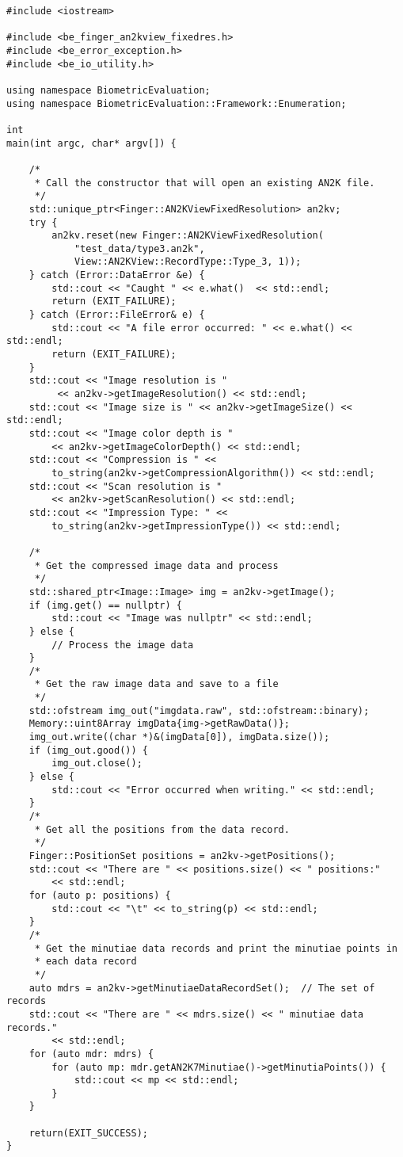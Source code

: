 \begin{lstlisting}[caption={Using an AN2K Finger View}, label=lst:an2kfingerviewuse]
#include <iostream>

#include <be_finger_an2kview_fixedres.h>
#include <be_error_exception.h>
#include <be_io_utility.h>

using namespace BiometricEvaluation;
using namespace BiometricEvaluation::Framework::Enumeration;

int
main(int argc, char* argv[]) {

	/*
	 * Call the constructor that will open an existing AN2K file.
	 */
	std::unique_ptr<Finger::AN2KViewFixedResolution> an2kv;
	try {
		an2kv.reset(new Finger::AN2KViewFixedResolution(
		    "test_data/type3.an2k",
		    View::AN2KView::RecordType::Type_3, 1));
	} catch (Error::DataError &e) {
		std::cout << "Caught " << e.what()  << std::endl;
		return (EXIT_FAILURE);
	} catch (Error::FileError& e) {
		std::cout << "A file error occurred: " << e.what() << std::endl;
		return (EXIT_FAILURE);
	}
	std::cout << "Image resolution is "
	     << an2kv->getImageResolution() << std::endl;
	std::cout << "Image size is " << an2kv->getImageSize() << std::endl;
	std::cout << "Image color depth is "
	    << an2kv->getImageColorDepth() << std::endl;
	std::cout << "Compression is " <<
	    to_string(an2kv->getCompressionAlgorithm()) << std::endl;
	std::cout << "Scan resolution is "
	    << an2kv->getScanResolution() << std::endl;
	std::cout << "Impression Type: " <<
	    to_string(an2kv->getImpressionType()) << std::endl;

	/*
	 * Get the compressed image data and process
	 */
	std::shared_ptr<Image::Image> img = an2kv->getImage();
	if (img.get() == nullptr) {
		std::cout << "Image was nullptr" << std::endl;
	} else {
		// Process the image data
	}
	/*
	 * Get the raw image data and save to a file
	 */
	std::ofstream img_out("imgdata.raw", std::ofstream::binary);
	Memory::uint8Array imgData{img->getRawData()};
	img_out.write((char *)&(imgData[0]), imgData.size());
	if (img_out.good()) {
		img_out.close();
	} else {
		std::cout << "Error occurred when writing." << std::endl;
	}
	/*
	 * Get all the positions from the data record.
	 */
	Finger::PositionSet positions = an2kv->getPositions();
	std::cout << "There are " << positions.size() << " positions:"
	    << std::endl;
	for (auto p: positions) {
		std::cout << "\t" << to_string(p) << std::endl;
	}
	/*
	 * Get the minutiae data records and print the minutiae points in
	 * each data record
	 */
	auto mdrs = an2kv->getMinutiaeDataRecordSet();	// The set of records
	std::cout << "There are " << mdrs.size() << " minutiae data records."
	    << std::endl;
	for (auto mdr: mdrs) {
		for (auto mp: mdr.getAN2K7Minutiae()->getMinutiaPoints()) {
			std::cout << mp << std::endl;
		}
	}

	return(EXIT_SUCCESS);
}
\end{lstlisting}

